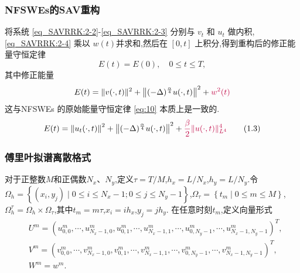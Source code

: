 \documentclass[aspectratio=169]{beamer}
\numberwithin{theorem}{section} %
\numberwithin{equation}{section}%
\numberwithin{figure}{section}%
\numberwithin{table}{section}%
\begin{document}
\begin{frame}\frametitle{NFSWEs的SAV重构}
	将系统 \eqref{eq_SAVRRK:2-2}-\eqref{eq_SAVRRK:2-3} 分别与 $v_t$ 和 $u_t$ 做内积, 
\eqref{eq_SAVRRK:2-4} 乘以 $w(t)$并求和,然后在 $[0, t]$ 上积分,得到重构后的修正能量守恒定律
\begin{equation}
E(t)=E(0), \quad 0 \leq t \leq T ,
\end{equation}
其中修正能量
\begin{equation}
	E(t)=\|v(\cdot, t)\|^2+\left\|(-\Delta)^{\frac{\alpha}{4}} u(\cdot, t)\right\|^{2}+\textcolor{purple}{w^2(t)}
\end{equation}
这与NFSWEs 的原始能量守恒定律 \eqref{eq:10} 本质上是一致的.
\begin{equation}
	E(t)=\left\|u_t(\cdot, t)\right\|^2+\left\|(-\Delta)^{\frac{\alpha}{4}} u(\cdot, t)\right\|^2+\textcolor{purple}{\frac{\beta}{2}\|u(\cdot, t)\|_{L^4}^4} \tag{1.3}
\end{equation}
\end{frame}

\begin{frame}\frametitle{傅里叶拟谱离散格式}
	对于正整数$M$和正偶数$N_{x}$、$N_{y}$,定义$\tau={T}/{M}$,$h_{x}={L}/{N_{x}}$,$h_{y}={L}/{N_{y}}$.令$\Omega_{h}=\left\{(x_{i}, y_{j}) \mid 0 \leq i \leq N_x-1;0 \leq j \leq N_y-1\right\}$,$\Omega_{\tau}=\left\{t_{m} \mid 0 \leq m \leq M\right\}$,$\Omega_{h}^{\tau}=\Omega_{h} \times \Omega_{\tau}$,其中$t_{m}=m \tau$,$x_{i}=i h_{x}$,$y_{j}=j h_{y}$.
	在任意时刻$t_m$,定义向量形式
	\begin{align}\label{eq_SAVRRK:47}
	&U^m=\left(u_{0,0}^m, \cdots, u_{N_{x}-1,0}^m, u_{0,1}^m, \cdots, u_{N_{x}-1,1}^m, \cdots, u_{0, N_{y}-1}^m, \cdots, u_{N_{x}-1, N_{y}-1}^m\right)^{T},\\
	&V^m=\left(v_{0,0}^m, \cdots, v_{N_{x}-1,0}^m, v_{0,1}^m, \cdots, v_{N_{x}-1,1}^m, \cdots, v_{0, N_{y}-1}^m, \cdots, v_{N_{x}-1, N_{y}-1}^m\right)^{T},\\
	&W^m=w^m.
	\end{align}
	
\end{frame}
\end{document}
